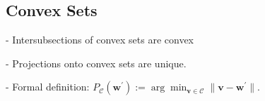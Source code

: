 











\subsection*{Convex Sets}

- Intersubsections of convex sets are convex

- Projections onto convex sets are unique.

- Formal definition:
$P_{\mathcal{C}}(\mathbf{w}^{\prime}):=\arg \min _{\mathbf{v} \in \mathcal{C}}\|\mathbf{v}-\mathbf{w}^{\prime}\|$.

